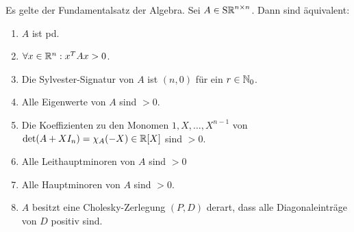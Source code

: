 \documentclass[../../main.tex]{subfiles}
\begin{document}
\begin{sat}\label{14.2.13}
Es gelte der Fundamentalsatz der Algebra. Sei $A\in\operatorname{S\mathbb R}^{n\times n}$. Dann sind äquivalent:
\begin{enumerate}[\normalfont(a)]
\item $A$ ist pd.
\item $\forall x\in \mathbb R^n: x^TAx> 0$.
\item Die Sylvester-Signatur von $A$ ist $(n,0)$ für ein $r\in \mathbb N_0$.
\item Alle Eigenwerte von $A$ sind $> 0$.
\item Die Koeffizienten zu den Monomen $1,X,\ldots ,X^{n-1}$ von $\det(A+XI_n)=\chi_A(-X)\in \mathbb R[X]$ sind $> 0$.
\item Alle Leithauptminoren von $A$ sind $>0$
\item Alle Hauptminoren von $A$ sind $>0$.
\item $A$ besitzt eine Cholesky-Zerlegung $(P,D)$ derart, dass alle Diagonaleinträge von $D$ positiv sind.
\end{enumerate}	 
\end{sat}
\end{document}
